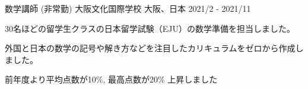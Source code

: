 \begin{cventries}
  \cventry
    {数学講師 (非常勤)} %
    {大阪文化国際学校} %
    {大阪、日本} %
    {2021/2 - 2021/11} %
    {
      \begin{cvitems} %
        \item {30名ほどの留学生クラスの日本留学試験（EJU）の数学準備を担当しました。}
        \item {外国と日本の数学の記号や解き方などを注目したカリキュラムをゼロから作成しました。}
        \item {前年度より平均点数が10\%, 最高点数が20\% 上昇しました}
      \end{cvitems}
    }

\end{cventries}
